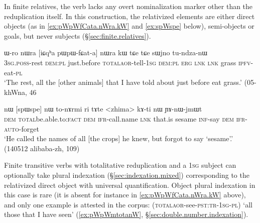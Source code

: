 In finite relatives, the verb lacks any overt nominalization marker other than the reduplication itself. In this construction, the relativized elements are either direct objects (as in \ref{ex:pWpWfCata.nWra.kW} and \ref{ex:spWspe} below), semi-objects or goals, but never subjects (§\ref{sec:finite.relatives}).

\begin{exe}
\ex \label{ex:pWpWfCata.nWra.kW}
\gll ɯ-ro nɯra [iɕqʰa pɯ\redp{}pɯ-fɕat-a] nɯra kɯ tɕe tɕe sɯjno tu-ndza-nɯ  \\
\textsc{3sg}.\textsc{poss}-rest \textsc{dem}:\textsc{pl} just.before \textsc{total}\redp{}\textsc{aor}-tell-\textsc{1sg} \textsc{dem}:\textsc{pl} \textsc{erg} \textsc{lnk}  \textsc{lnk} grass \textsc{ipfv}-eat-\textsc{pl} \\
\glt `The rest, all the [other animals] that I have told about just before eat grass.' (05-khWna, 46
\end{exe}


\begin{exe}
\ex \label{ex:spWspe}
\gll nɯ [spɯ\redp{}spe] nɯ to-nɤrmi ri tɤte <zhima> kɤ-ti nɯ ɲɤ-nɯ-jmɯt \\
\textsc{dem} \textsc{total}\redp{}be.able.to:\textsc{fact} \textsc{dem} \textsc{ifr}-call.name \textsc{lnk} that.is sesame \textsc{inf}-say \textsc{dem} \textsc{ifr}-\textsc{auto}-forget \\
\glt `He called the names of all [the crops] he knew, but forgot to say `sesame'.' (140512 alibaba-zh, 109)
\end{exe}

Finite transitive verbs with totalitative reduplication and a \textsc{1sg} subject can optionally take plural indexation (§\ref{sec:indexation.mixed}) corresponding to the relativized direct object with universal quantification. Object plural indexation in this case is rare (it is absent for instance in \ref{ex:pWpWfCata.nWra.kW} above), and only one example is attested in the corpus:  (\textsc{total}\redp{}\textsc{aor}-see-\textsc{pst}:\textsc{tr}-\textsc{1sg}-\textsc{pl}) `all those that I have seen' (\ref{ex:pWpWmtotanW}, §\ref{sec:double.number.indexation}).


